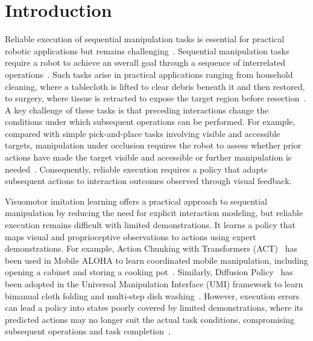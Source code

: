 \section{Introduction}
\label{sec:intro}


Reliable execution of sequential manipulation tasks is essential for practical robotic applications but remains challenging~\cite{xu2018ntp}.
Sequential manipulation tasks require a robot to achieve an overall goal through a sequence of interrelated operations~\cite{liang2022sensorimotor}.
Such tasks arise in practical applications ranging from household
cleaning, where a tablecloth is lifted to clear debris beneath it
and then restored, to surgery, where tissue is retracted to expose
the target region before resection~\cite{ge2021electrosurgery}.
A key challenge of these tasks is that preceding interactions change the conditions
under which subsequent operations can be performed.
For example, compared with simple pick-and-place tasks involving
visible and accessible targets, manipulation under occlusion requires
the robot to assess whether prior actions have made the target visible
and accessible or further manipulation is needed~\cite{dogar2014search,attanasio2020retraction}.
Consequently, reliable execution requires a policy that adapts
subsequent actions to interaction outcomes observed through visual feedback.

Visuomotor imitation learning offers a practical approach to sequential
manipulation by reducing the need for explicit interaction modeling,
but reliable execution remains difficult with limited demonstrations.
It learns a policy that maps visual and proprioceptive observations
to actions using expert demonstrations.
For example, Action Chunking with Transformers (ACT)~\cite{zhao2023act}
has been used in Mobile ALOHA to learn coordinated mobile manipulation,
including opening a cabinet and storing a cooking pot~\cite{fu2024mobilealoha}.
Similarly, Diffusion Policy~\cite{chi2023diffusion} has been adopted
in the Universal Manipulation Interface (UMI) framework to learn
bimanual cloth folding and multi-step dish washing~\cite{chi2024umi}.
However, execution errors can lead a policy into states poorly covered
by limited demonstrations, where its predicted actions may no longer
suit the actual task conditions, compromising subsequent operations
and task completion~\cite{ross2011}.


